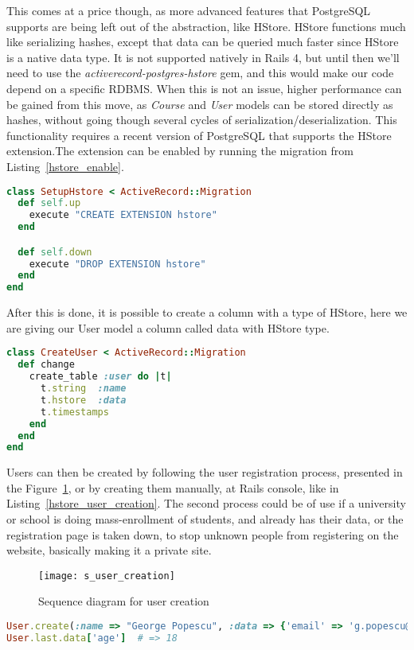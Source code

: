 This comes at a price though, as more advanced features that PostgreSQL supports are
being left out of the abstraction, like HStore.
HStore functions much like serializing hashes, except that data can be queried
much faster since HStore is a native data type. It is not  supported natively in
Rails 4, but until then we’ll need to use the \textit{activerecord-postgres-hstore} gem,
and this would make our code depend on a specific RDBMS. When this is not an
issue, higher performance can be gained from this move, as \textit{Course}
and \textit{User} models can be stored directly as hashes, without going though
several cycles of serialization/deserialization.
This functionality requires a recent version of PostgreSQL that supports the HStore
extension.The extension can be enabled by running the migration from Listing~\ref{hstore_enable}.
\begin{lstlisting}[language=Ruby, caption={Enable HStore Postgres extension}, label=hstore_enable]
class SetupHstore < ActiveRecord::Migration
  def self.up
    execute "CREATE EXTENSION hstore"
  end

  def self.down
    execute "DROP EXTENSION hstore"
  end
end
\end{lstlisting}

After this is done, it is possible to create a column with a type of HStore, here
we are giving our User model a column called data with HStore type.

\begin{lstlisting}[language=Ruby, caption={Hstore for User model}, label=hstore_course]
class CreateUser < ActiveRecord::Migration
  def change
    create_table :user do |t|
      t.string  :name
      t.hstore  :data
      t.timestamps
    end
  end
end
\end{lstlisting}
Users can then be created by following the user registration process, presented in the Figure~\ref{fig:user_creation},
or by creating them manually, at Rails console, like in Listing~\ref{hstore_user_creation}.
The second process could be of use if a university or school is doing mass-enrollment of students,
and already has their data, or the registration page is taken down, to stop unknown people from registering
on the website, basically making it a private site.
\begin{figure}[ht!]
    \centering
    \texttt{[image: s\_user\_creation]}
    \caption{Sequence diagram for user creation}
    \label{fig:user_creation}
\end{figure}

\begin{lstlisting}[language=Ruby, caption={Creating a new User}, label=hstore_user_creation]
User.create(:name => "George Popescu", :data => {'email' => 'g.popescu@gmail.com', 'age' => 18, 'group' => '11B'})
User.last.data['age']  # => 18
\end{lstlisting}


